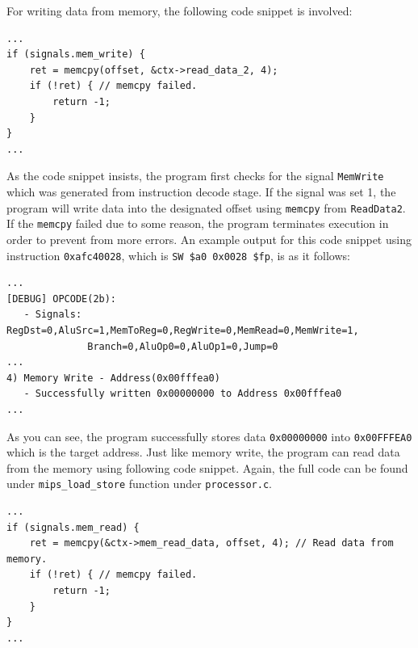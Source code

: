 \documentclass{homework}
\begin{document}
For writing data from memory, the following code snippet is involved:
\\
\begin{center}
\begin{code}
\begin{verbatim}
...
if (signals.mem_write) { 
    ret = memcpy(offset, &ctx->read_data_2, 4); 
    if (!ret) { // memcpy failed.
        return -1;
    }
}
...
\end{verbatim}
\end{code}
\end{center}
As the code snippet insists, the program first checks for the signal \texttt{MemWrite} which was generated from instruction decode stage. If the signal was set 1, the program will write data into the designated offset using \texttt{memcpy} from \texttt{ReadData2}.  If the \texttt{memcpy} failed due to some reason, the program terminates execution in order to prevent from more errors. An example output for this code snippet using instruction \texttt{0xafc40028}, which is \texttt{SW \$a0 0x0028 \$fp}, is as it follows:
\pagebreak
\\
\begin{center}
\begin{code}
\begin{verbatim}
...
[DEBUG] OPCODE(2b):
   - Signals: RegDst=0,AluSrc=1,MemToReg=0,RegWrite=0,MemRead=0,MemWrite=1,
              Branch=0,AluOp0=0,AluOp1=0,Jump=0
...
4) Memory Write - Address(0x00fffea0)
   - Successfully written 0x00000000 to Address 0x00fffea0
...
\end{verbatim}
\end{code}
\end{center}
As you can see, the program successfully stores data \texttt{0x00000000} into \texttt{0x00FFFEA0} which is the target address. Just like memory write, the program can read data from the memory using following code snippet. Again, the full code can be found under \texttt{mips_load_store} function under \texttt{processor.c}.
\\
\begin{center}
\begin{code}
\begin{verbatim}
...
if (signals.mem_read) { 
    ret = memcpy(&ctx->mem_read_data, offset, 4); // Read data from memory.
    if (!ret) { // memcpy failed.
        return -1;
    }
}
...
\end{verbatim}
\end{code}
\end{center}
\end{document}
